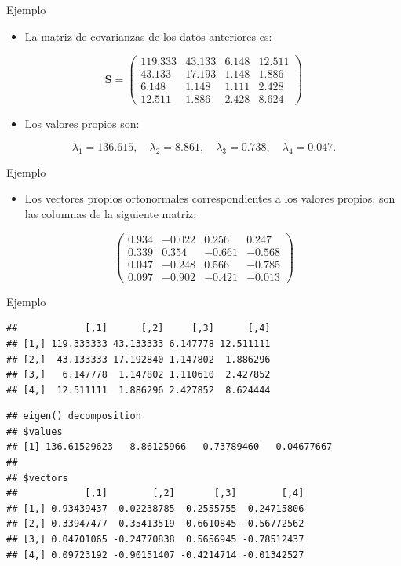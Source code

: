 \documentclass[
  ignorenonframetext,
]{beamer}
\providecommand{\tightlist}{%
  \setlength{\itemsep}{0pt}\setlength{\parskip}{0pt}}
\begin{document}
\begin{frame}{Ejemplo}
\label{ejemplo-2}
\begin{itemize}
\tightlist
\item
  La matriz de covarianzas de los datos anteriores es:
\end{itemize}

\[
\mathbf{S}=
\begin{pmatrix}
119.333 & 43.133 & 6.148 & 12.511 \\
 43.133 & 17.193 & 1.148 & 1.886 \\
 6.148 & 1.148 & 1.111 & 2.428 \\
 12.511 & 1.886 & 2.428 & 8.624 
\end{pmatrix}
\]

\begin{itemize}
\tightlist
\item
  Los valores propios son:
\end{itemize}

\[\lambda_1=136.615,\quad \lambda_2=8.861,\quad \lambda_3 = 0.738,\quad \lambda_4 = 0.047.\]
\end{frame}

\begin{frame}{Ejemplo}
\label{ejemplo-3}
\begin{itemize}
\tightlist
\item
  Los vectores propios ortonormales correspondientes a los valores
  propios, son las columnas de la siguiente matriz:
\end{itemize}

\[
\left(
\begin{array}{rrrr}
0.934 & -0.022 & 0.256 & 0.247 \\
0.339 & 0.354 & -0.661 & -0.568 \\
0.047 & -0.248 & 0.566 & -0.785 \\
0.097 & -0.902 & -0.421 & -0.013
\end{array}
\right)
\]
\end{frame}

\begin{frame}[fragile]{Ejemplo}
\label{ejemplo-4}
\begin{verbatim}
##            [,1]      [,2]     [,3]      [,4]
## [1,] 119.333333 43.133333 6.147778 12.511111
## [2,]  43.133333 17.192840 1.147802  1.886296
## [3,]   6.147778  1.147802 1.110610  2.427852
## [4,]  12.511111  1.886296 2.427852  8.624444
\end{verbatim}

\begin{verbatim}
## eigen() decomposition
## $values
## [1] 136.61529623   8.86125966   0.73789460   0.04677667
## 
## $vectors
##            [,1]        [,2]       [,3]        [,4]
## [1,] 0.93439437 -0.02238785  0.2555755  0.24715806
## [2,] 0.33947477  0.35413519 -0.6610845 -0.56772562
## [3,] 0.04701065 -0.24770838  0.5656945 -0.78512437
## [4,] 0.09723192 -0.90151407 -0.4214714 -0.01342527
\end{verbatim}
\end{frame}
\end{document}
